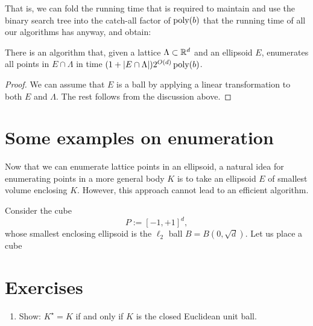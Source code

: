 That is, we can fold the running time that is required to maintain and use the binary search tree
into the catch-all factor of $\operatorname{poly}(b)$ that the running time of all our algorithms has anyway,
and obtain:

\begin{theorem}
  There is an algorithm that,
  given a lattice $\Lambda \subset \mathbb{R}^d$ and an ellipsoid $E$,
  enumerates all points in $E \cap \Lambda$ in time
  $(1 + |E \cap \Lambda|) 2^{O(d)} \operatorname{poly}(b)$.
\end{theorem}
\begin{proof}
  We can assume that $E$ is a ball by applying a linear transformation to both $E$ and $\Lambda$.
  The rest follows from the discussion above.
\end{proof}





\section{Some examples on enumeration}

Now that we can enumerate lattice points in an ellipsoid,
a natural idea for enumerating points in a more general body $K$
is to take an ellipsoid $E$ of smallest volume enclosing $K$.
However, this approach cannot lead to an efficient algorithm.

Consider the cube
\[
  P := [-1, +1]^d,
\]
whose smallest enclosing ellipsoid is the $\ell_2$ ball $B = B(0,\sqrt{d})$.
Let us place a cube




\section*{Exercises}

\begin{enumerate}
  \item Show: $K^\star = K$ if and only if $K$ is the closed Euclidean unit ball.
\end{enumerate}

